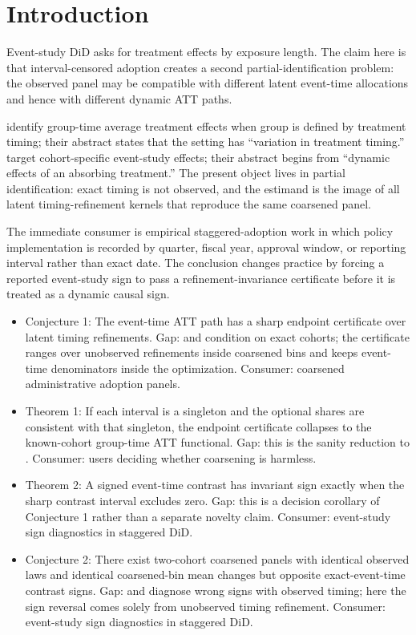 \documentclass[11pt]{article}
\theoremstyle{definition}
\theoremstyle{plain}
\theoremstyle{remark}
\begin{document}
\section{Introduction}
Event-study DiD asks for treatment effects by exposure length. The claim here is that interval-censored adoption creates a second partial-identification problem: the observed panel may be compatible with different latent event-time allocations and hence with different dynamic ATT paths.

\citet{CallawaySantAnna2021} identify group-time average treatment effects when group is defined by treatment timing; their abstract states that the setting has ``variation in treatment timing.'' \citet{SunAbraham2021} target cohort-specific event-study effects; their abstract begins from ``dynamic effects of an absorbing treatment.'' The present object lives in partial identification: exact timing is not observed, and the estimand is the image of all latent timing-refinement kernels that reproduce the same coarsened panel.

The immediate consumer is empirical staggered-adoption work in which policy implementation is recorded by quarter, fiscal year, approval window, or reporting interval rather than exact date. The conclusion changes practice by forcing a reported event-study sign to pass a refinement-invariance certificate before it is treated as a dynamic causal sign.

\begin{itemize}[leftmargin=*]
\item Conjecture 1: The event-time ATT path has a sharp endpoint certificate over latent timing refinements. Gap: \citet{CallawaySantAnna2021} and \citet{SunAbraham2021} condition on exact cohorts; the certificate ranges over unobserved refinements inside coarsened bins and keeps event-time denominators inside the optimization. Consumer: coarsened administrative adoption panels.
\item Theorem 1: If each interval is a singleton and the optional shares are consistent with that singleton, the endpoint certificate collapses to the known-cohort group-time ATT functional. Gap: this is the sanity reduction to \citet{CallawaySantAnna2021}. Consumer: users deciding whether coarsening is harmless.
\item Theorem 2: A signed event-time contrast has invariant sign exactly when the sharp contrast interval excludes zero. Gap: this is a decision corollary of Conjecture 1 rather than a separate novelty claim. Consumer: event-study sign diagnostics in staggered DiD.
\item Conjecture 2: There exist two-cohort coarsened panels with identical observed laws and identical coarsened-bin mean changes but opposite exact-event-time contrast signs. Gap: \citet{GoodmanBacon2021} and \citet{DeChaisemartinDHaultfoeuille2020} diagnose wrong signs with observed timing; here the sign reversal comes solely from unobserved timing refinement. Consumer: event-study sign diagnostics in staggered DiD.
\end{itemize}
\end{document}
